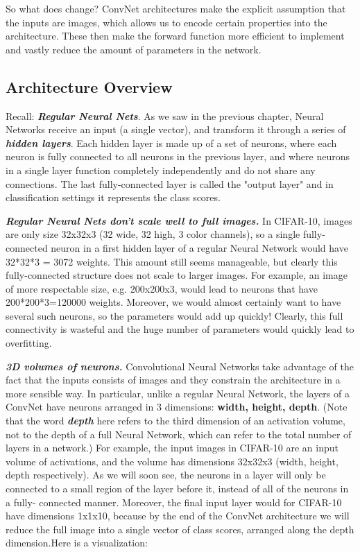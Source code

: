 \documentclass[fleqn,10pt]{olplainarticle}
\theoremstyle{definition}
\theoremstyle{remark}
\begin{document}
So what does change? ConvNet architectures make the explicit assumption that the inputs are images, which allows us to encode certain properties into the architecture. These then make the forward function more efficient to implement and vastly reduce the amount of parameters in the network.

\subsection*{Architecture Overview}
Recall: \textbf{\textit{Regular Neural Nets}}. As we saw in the previous chapter, Neural Networks receive an input (a single vector), and transform it through a series of \textbf{\textit{hidden layers}}. Each hidden layer is made up of a set of neurons, where each neuron is fully connected to all neurons in the previous layer, and where neurons in a single layer function completely independently and do not share any connections. The last fully-connected layer is called the "output layer" and in classification settings it represents the class scores.\medskip

\textbf{\textit{Regular Neural Nets don't scale well to full images.}} In CIFAR-10, images are only size 32x32x3 (32 wide, 32 high, 3 color channels), so a single fully-connected neuron in a first hidden layer of a regular Neural Network would have 32*32*3 = 3072 weights. This amount still seems manageable, but clearly this fully-connected structure does not scale to larger images. For example, an image of more respectable size, e.g. 200x200x3, would lead to neurons that have 200*200*3=120000 weights. Moreover, we would almost certainly want to have several such neurons, so the parameters would add up quickly! Clearly, this full connectivity is wasteful and the huge number of parameters would quickly lead to overfitting.\medskip

\textbf{\textit{3D volumes of neurons.}} Convolutional Neural Networks take advantage of the fact that the inputs consists of images and they constrain the architecture in a more sensible way. In particular, unlike a regular Neural Network, the layers of a ConvNet have neurons arranged in 3 dimensions: \textbf{width, height, depth}. (Note that the word \textbf{\textit{depth}} here refers to the third dimension of an activation volume, not to the depth of a full Neural Network, which can refer to the total number of layers in a network.) For example, the input images in CIFAR-10 are an input volume of activations, and the volume has dimensions 32x32x3 (width, height, depth respectively).
As we will soon see, the neurons in a layer will only be connected to a small region of the layer before it, instead of all of the neurons in a fully- connected manner. Moreover, the final input layer would for CIFAR-10 have dimensions 1x1x10, because by the end of the ConvNet architecture we will reduce the full image into a single vector of class scores, arranged along the depth dimension.Here is a visualization:
\end{document}
